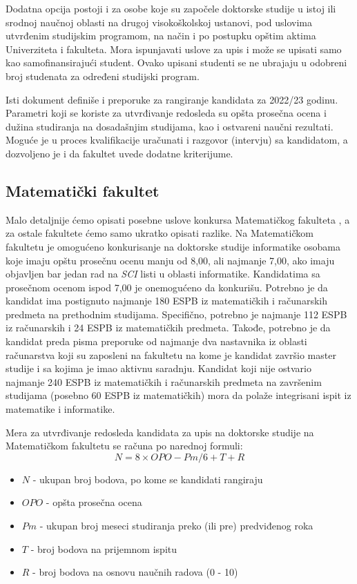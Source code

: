 \documentclass[a4paper]{article}
\begin{document}
Dodatna opcija postoji i za osobe koje su započele doktorske studije u istoj ili srodnoj naučnoj oblasti na drugoj visokoškolskoj ustanovi, pod uslovima utvrđenim studijskim programom, na način i po postupku opštim aktima Univerziteta i fakulteta. Mora ispunjavati uslove za upis i može se upisati samo kao samofinansirajući student. Ovako upisani studenti se ne ubrajaju u odobreni broj studenata za određeni studijski program. 

Isti dokument \cite{konkursBeograd} definiše i preporuke za rangiranje kandidata za 2022/23 godinu. Parametri koji se koriste za utvrđivanje redosleda su opšta prosečna ocena i dužina studiranja na dosadašnjim studijama, kao i ostvareni naučni rezultati. Moguće je u proces kvalifikacije uračunati i razgovor (intervju) sa kandidatom, a dozvoljeno je i da fakultet uvede dodatne kriterijume. 

\subsection{Matematički fakultet}

Malo detaljnije ćemo opisati posebne uslove konkursa Matematičkog fakulteta \cite{konkursMATF}, a za ostale fakultete ćemo samo ukratko opisati razlike. Na Matematičkom fakultetu je omogućeno konkurisanje na doktorske studije informatike osobama koje imaju opštu prosečnu ocenu manju od 8,00, ali najmanje 7,00, ako imaju objavljen bar jedan rad na \emph{SCI} listi u oblasti informatike. Kandidatima sa prosečnom ocenom ispod 7,00 je onemogućeno da konkurišu. Potrebno je da kandidat ima postignuto najmanje 180 ESPB iz matematičkih i računarskih predmeta na prethodnim studijama. Specifično, potrebno je najmanje 112 ESPB iz računarskih i 24 ESPB iz matematičkih predmeta. Takođe, potrebno je da kandidat preda pisma preporuke od najmanje dva nastavnika iz oblasti računarstva koji su zaposleni na fakultetu na kome je kandidat završio master studije i sa kojima je imao aktivnu saradnju. Kandidat koji nije ostvario najmanje 240 ESPB iz matematičkih i računarskih predmeta na završenim studijama (posebno 60 ESPB iz matematičkih) mora da polaže integrisani ispit iz matematike i informatike. 

Mera za utvrđivanje redosleda kandidata za upis na doktorske studije na Matematičkom fakultetu \cite{konkursMATF} se računa po narednoj formuli: 
$$N = 8 \times OPO - Pm / 6 + T + R$$
\begin{itemize}
\item
$N$ - ukupan broj bodova, po kome se kandidati rangiraju
\item
$OPO$ - opšta prosečna ocena
\item
$Pm$ - ukupan broj meseci studiranja preko (ili pre) predviđenog roka
\item
$T$ - broj bodova na prijemnom ispitu
\item
$R$ - broj bodova na osnovu naučnih radova (0 - 10)
\end{itemize}
\end{document}

